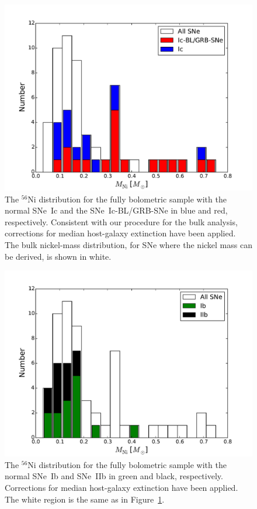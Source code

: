 \documentclass[a4paper,fleqn,usenatbib]{mnras}
\begin{document}
\begin{figure}
\centering
\includegraphics[scale=0.4]{full_peak_Mni_dist_c.pdf}
\caption{The $^{56}$Ni distribution for the fully bolometric sample with the normal SNe~Ic and the SNe~Ic-BL/GRB-SNe in blue and red, respectively. Consistent with our procedure for the bulk analysis, corrections for median host-galaxy extinction have been applied. The bulk nickel-mass distribution, for SNe where the nickel mass can be derived, is shown in white. }
\label{fig:ONIRMNIc}
\end{figure}

\begin{figure}
\centering
\includegraphics[scale=0.4]{full_peak_Mni_dist_b.pdf}
\caption{The $^{56}$Ni distribution for the fully bolometric sample with the normal SNe~Ib and SNe~IIb in green and black, respectively. Corrections for median host-galaxy extinction have been applied. The white region is the same as in Figure~\ref{fig:ONIRMNIc}.}
\label{fig:ONIRMNIb}
\end{figure}
\end{document}
